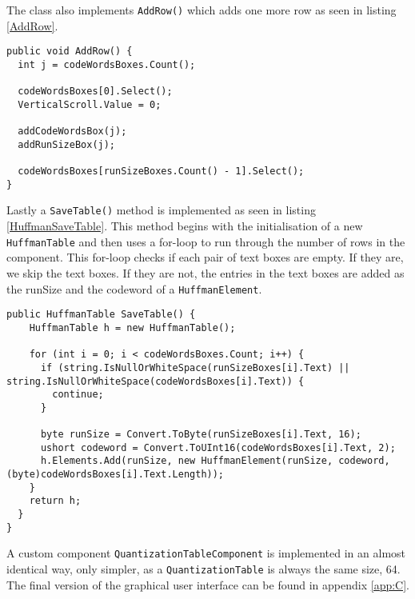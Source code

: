 The class also implements \lstinline|AddRow()| which adds one more row as seen in listing \ref{AddRow}.

\begin{lstlisting}[firstnumber=80,label=AddRow, caption={\lstinline|AddRow()| method \textbf{File: }HuffmanTableComponent.cs}]
public void AddRow() {
  int j = codeWordsBoxes.Count();
  
  codeWordsBoxes[0].Select();
  VerticalScroll.Value = 0;
  
  addCodeWordsBox(j);
  addRunSizeBox(j);

  codeWordsBoxes[runSizeBoxes.Count() - 1].Select();
}
\end{lstlisting}

Lastly a \lstinline|SaveTable()| method is implemented as seen in listing \ref{HuffmanSaveTable}.
This method begins with the initialisation of a new \lstinline|HuffmanTable| and then uses a for-loop to run through the number of rows in the component.
This for-loop checks if each pair of text boxes are empty.
If they are, we skip the text boxes.
If they are not, the entries in the text boxes are added as the runSize and the codeword of a  \lstinline|HuffmanElement|. 

\begin{lstlisting}[firstnumber=137,label=HuffmanSaveTable, caption={Save method of the \lstinline|HuffmanTable| method \textbf{File: }HuffmanTableComponent.cs}]
public HuffmanTable SaveTable() {
    HuffmanTable h = new HuffmanTable();
    
    for (int i = 0; i < codeWordsBoxes.Count; i++) {
      if (string.IsNullOrWhiteSpace(runSizeBoxes[i].Text) || string.IsNullOrWhiteSpace(codeWordsBoxes[i].Text)) {
        continue;
      }
      
      byte runSize = Convert.ToByte(runSizeBoxes[i].Text, 16);
      ushort codeword = Convert.ToUInt16(codeWordsBoxes[i].Text, 2);
      h.Elements.Add(runSize, new HuffmanElement(runSize, codeword, (byte)codeWordsBoxes[i].Text.Length));
    }
    return h;
  }
}
\end{lstlisting}

A custom component \lstinline|QuantizationTableComponent| is implemented in an almost identical way, only simpler, as a \lstinline|QuantizationTable| is always the same size, 64.
The final version of the graphical user interface can be found in appendix \ref{app:C}.